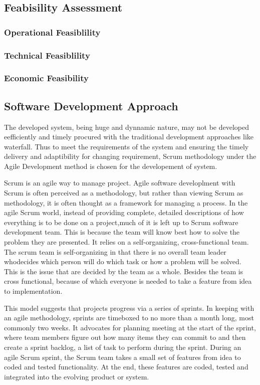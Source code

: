 \subsection{Feabisility Assessment}
\subsubsection{Operational Feasiblility}
\subsubsection{Technical Feasiblility}
\subsubsection{Economic Feasibility}
\subsection{Software Development Approach}
The developed system, being huge and dynnamic nature, may not be developed eefficiently and timely procured with the traditional development approaches like waterfall. Thus to meet the requirements of the system and ensuring the timely delivery and adaptibility for changing requirement, Scrum methodology under the Agile Development method is chosen for the developement of system.

Scrum is an agile way to manage project. Agile software developlment with Scrum is often perceived as a methodology, but rather than viewing Scrum as methodology, it is often thought as a framework for managing a process. In the agile Scrum world, instead of providing complete, detailed descriptions of how everything is to be done on a project,much of it is left up to Scrum software development team. This is because the team will know best how to solve the problem they are presented. It relies on a self-organizing, cross-functional team. The scrum team is self-organizing in that there is no overall team leader whodecides which person will do which task or how a problem will be solved. This is the issue that are decided by the team as a whole. Besides the team is cross functional, because of which everyone is needed to take a feature from idea to implementation. 

This model suggests that projects progress via a series of sprints. In keeping with an agile methodology, sprints are timeboxed to no more than a month long, most commonly two weeks. It advocates for planning meeting at the start of the sprint, where team members figure out how many items they can commit to and then create a sprint backlog, a list of task to perform during the sprint. During an agile Scrum sprint, the Scrum team takes a small set of features from idea to coded and tested functionality. At the end, these features are coded, tested and integrated into the evolving product or system.

